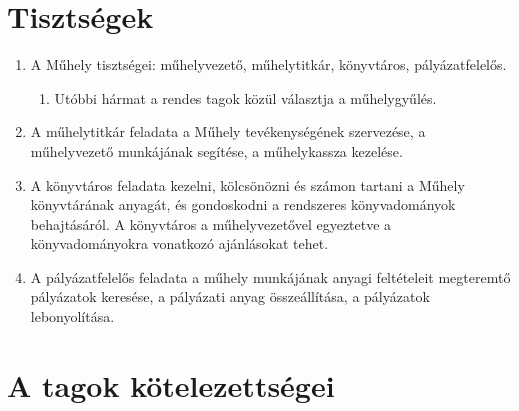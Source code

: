 \documentclass{../styles/rulebook}
\begin{document}
\section{Tisztségek}

\begin{enumerate}
	\item A Műhely tisztségei: műhelyvezető, műhelytitkár, könyvtáros, pályázatfelelős.
	\begin{enumerate}
		\item Utóbbi hármat a rendes tagok közül választja a műhelygyűlés.	
	\end{enumerate}
	\item A műhelytitkár feladata a Műhely tevékenységének szervezése, a műhelyvezető
	munkájának segítése, a műhelykassza kezelése.
	\item A könyvtáros feladata kezelni, kölcsönözni és számon tartani a Műhely
	könyvtárának anyagát, és gondoskodni a rendszeres könyvadományok behajtásáról.
	A könyvtáros a műhelyvezetővel egyeztetve a könyvadományokra vonatkozó
	ajánlásokat tehet.
	\item A pályázatfelelős feladata a műhely munkájának anyagi feltételeit megteremtő
	pályázatok keresése, a pályázati anyag összeállítása, a pályázatok lebonyolítása.
\end{enumerate}


\section{A tagok kötelezettségei}
\end{document}
